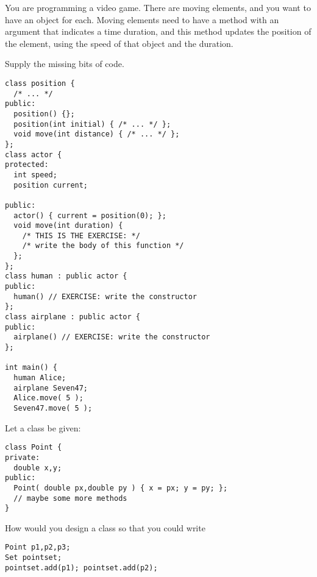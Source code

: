 \begin{exercise}
  You are programming a video game. There are moving elements, and you
  want to have an object for each. Moving elements need to have a
  method  with an argument that indicates a time duration, and
  this method updates the position of the element, using the speed of
  that object and the duration.

  Supply the missing bits of code.
\begin{verbatim}
class position {
  /* ... */
public:
  position() {};
  position(int initial) { /* ... */ };
  void move(int distance) { /* ... */ };
};
class actor {
protected:
  int speed;
  position current;

public:
  actor() { current = position(0); };
  void move(int duration) {
    /* THIS IS THE EXERCISE: */
    /* write the body of this function */
  };
};
class human : public actor {
public:
  human() // EXERCISE: write the constructor
};
class airplane : public actor {
public:
  airplane() // EXERCISE: write the constructor
};

int main() {
  human Alice;
  airplane Seven47;
  Alice.move( 5 );
  Seven47.move( 5 );
\end{verbatim}
\end{exercise}

\begin{exercise}
  Let a  class be given:
\begin{verbatim}
class Point {
private: 
  double x,y;
public:
  Point( double px,double py ) { x = px; y = py; };
  // maybe some more methods
}
\end{verbatim}
How would you design a  class so that you could write
\begin{verbatim}
Point p1,p2,p3;
Set pointset;
pointset.add(p1); pointset.add(p2);
\end{verbatim}
\end{exercise}

